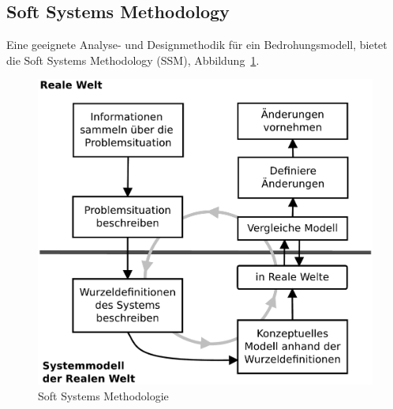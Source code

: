 \documentclass[11pt,a4paper]{report}
\begin{document}
\subsection{Soft Systems Methodology}

Eine geeignete Analyse- und Designmethodik für ein Bedrohungsmodell, bietet die Soft Systems Methodology (SSM), Abbildung~\ref{fig:ssm}.

\begin{figure}[htbp]
\centering
\includegraphics[scale=0.30]{images/ssm.pdf}
\caption{Soft Systems Methodologie}
\label{fig:ssm}
\end{figure}
\end{document}
